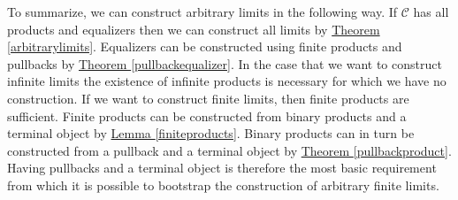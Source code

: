 To summarize, we can construct arbitrary limits in the following way.
If $\mathscr C$ has all products and equalizers then we can
construct all limits by
\hyperref[arbitrarylimits]{Theorem \ref*{arbitrarylimits}}.
Equalizers can be constructed using finite products and pullbacks
by \hyperref[arbitrarylimits]{Theorem \ref*{pullbackequalizer}}.
In the case that we want to construct infinite limits
the existence of infinite products is necessary
for which we have no construction.
If we want to construct finite limits, then finite products are sufficient.
Finite products can be constructed from binary products and a terminal object
by \hyperref[finiteproducts]{Lemma \ref*{finiteproducts}}.
Binary products can in turn be constructed from a pullback and a terminal object
by \hyperref[arbitrarylimits]{Theorem \ref*{pullbackproduct}}.
Having pullbacks and a terminal object is therefore the most basic requirement from
which it is possible to bootstrap the construction of arbitrary finite limits.

